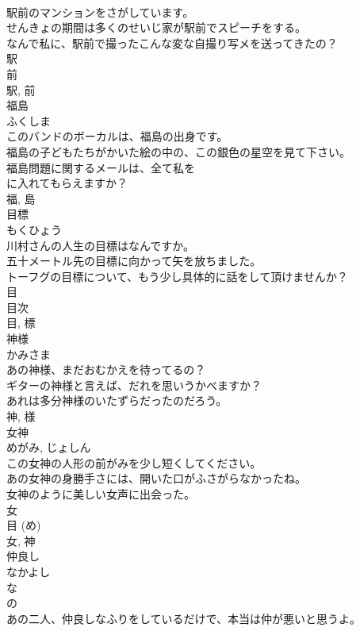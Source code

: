 \documentclass[8pt]{extreport}
\begin{document}
\begin{CJK}{UTF8}{min}
\\	駅前のマンションをさがしています。	
\\	せんきょの期間は多くのせいじ家が駅前でスピーチをする。	
\\	なんで私に、駅前で撮ったこんな変な自撮り写メを送ってきたの？	
\\	駅 
\\	前 
\\	駅, 前	
\\	福島	
\\	ふくしま	
\\	このバンドのボーカルは、福島の出身です。	
\\	福島の子どもたちがかいた絵の中の、この銀色の星空を見て下さい。	
\\	福島問題に関するメールは、全て私を
\\	に入れてもらえますか？	
\\	福, 島	
\\	目標	
\\	もくひょう	
\\	川村さんの人生の目標はなんですか。	
\\	五十メートル先の目標に向かって矢を放ちました。	
\\	トーフグの目標について、もう少し具体的に話をして頂けませんか？	
\\	目 
\\	目次 
\\	目, 標	
\\	神様	
\\	かみさま	
\\	あの神様、まだおむかえを待ってるの？	
\\	ギターの神様と言えば、だれを思いうかべますか？	
\\	あれは多分神様のいたずらだったのだろう。	
\\	神, 様	
\\	女神	
\\	めがみ, じょしん	
\\	この女神の人形の前がみを少し短くしてください。	
\\	あの女神の身勝手さには、開いた口がふさがらなかったね。	
\\	女神のように美しい女声に出会った。	
\\	女 
\\	目 (め) 
\\	女, 神	
\\	仲良し	
\\	なかよし	
\\	な 
\\	の 
\\	あの二人、仲良しなふりをしているだけで、本当は仲が悪いと思うよ。	

\end{CJK}
\end{document}
